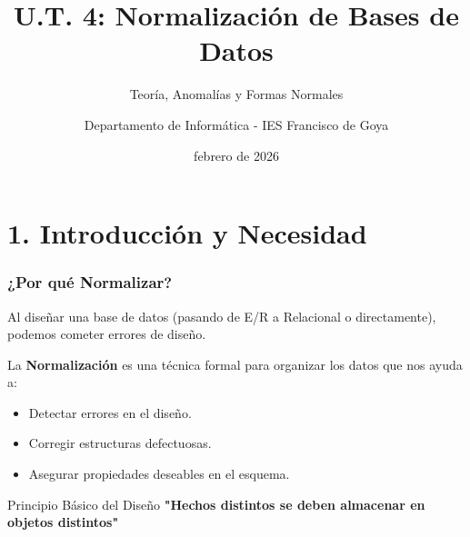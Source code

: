 \documentclass{beamer}
\title{U.T. 4: Normalización de Bases de Datos}
\subtitle{Teoría, Anomalías y Formas Normales}
\author{Departamento de Informática - IES Francisco de Goya}
\date{febrero de 2026}
\begin{document}
\begin{frame}
  \titlepage
\end{frame}

\section{1. Introducción y Necesidad}

\begin{frame}
  \frametitle{¿Por qué Normalizar?}
  Al diseñar una base de datos (pasando de E/R a Relacional o directamente), podemos cometer errores de diseño.
  
  \vspace{1em}
  La \textbf{Normalización} es una técnica formal para organizar los datos que nos ayuda a:
  \begin{itemize}
      \item Detectar errores en el diseño.
      \item Corregir estructuras defectuosas.
      \item Asegurar propiedades deseables en el esquema.
  \end{itemize}

  \begin{block}{Principio Básico del Diseño}
    \centering
    \textbf{"Hechos distintos se deben almacenar en objetos distintos"}
  \end{block}
\end{frame}
\end{document}
